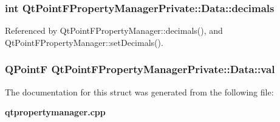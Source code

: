 \subsubsection[{decimals}]{\setlength{\rightskip}{0pt plus 5cm}int Qt\+Point\+F\+Property\+Manager\+Private\+::\+Data\+::decimals}\label{structQtPointFPropertyManagerPrivate_1_1Data_acacb6dbc4d59142e837cedcb102e59f5}


Referenced by Qt\+Point\+F\+Property\+Manager\+::decimals(), and Qt\+Point\+F\+Property\+Manager\+::set\+Decimals().

\subsubsection[{val}]{\setlength{\rightskip}{0pt plus 5cm}Q\+PointF Qt\+Point\+F\+Property\+Manager\+Private\+::\+Data\+::val}\label{structQtPointFPropertyManagerPrivate_1_1Data_aabe48c490b2aa1799bfd32dc94c96da8}


The documentation for this struct was generated from the following file\+:\begin{DoxyCompactItemize}
\item 
{\bf qtpropertymanager.\+cpp}\end{DoxyCompactItemize}
